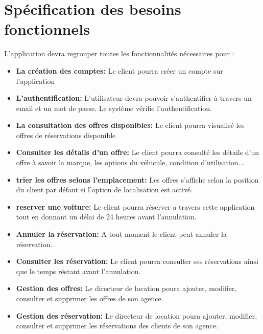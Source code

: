 \documentclass[12pt,a4paper]{report}
\begin{document}
		\section{Spécification des besoins fonctionnels}
L’application devra regrouper toutes les fonctionnalités nécessaires pour :\\
				\begin{itemize}
					\item \textbf{La création des comptes:} Le client pourra créer un compte sur l'application 
					\item \textbf{L'authentification:} L’utilisateur devra pouvoir s’authentifier à travers un email et un mot de passe. Le système vérifie l’authentification.
					\item \textbf{La consultation des offres disponibles:} Le client pourra visualisé les offres de réservations disponible
					\item \textbf{Consulter les détails d'un offre:} Le client pourra consulté les détails d'un offre à savoir la marque, les options du véhicule, condition d'utilisation...
					\item \textbf{trier les offres selons l'emplacement:} Les offres s'affiche selon la position du client par défaut si l'option de localisation est activé.
					\item \textbf{reserver une voiture:} Le client pourra réserver a travers cette application tout en donnant un délai de 24 heures avant l'annulation.
					\item \textbf{Annuler la réservation:} A tout moment le client peut annuler la réservation.
					\item \textbf{Consulter les réservation:} Le client pourra consulter ses réservations ainsi que le temps réstant avant l'annulation.
					\item \textbf{Gestion des offres:} Le directeur de location poura ajouter, modifier, consulter et supprimer les offres de son agence.
					\item \textbf{Gestion des réservation:} Le directeur de location poura ajouter, modifier, consulter et supprimer les réservations des clients de son agence.
					 
				\end{itemize}
\end{document}
